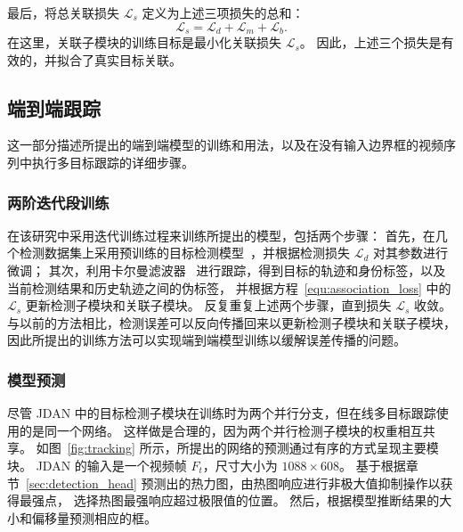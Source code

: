 最后，将总关联损失 $\mathcal L_s$ 定义为上述三项损失的总和：
\begin{equation} \label{equ:association_loss}
\mathcal L_{s} = \mathcal L_d + \mathcal L_m + \mathcal L_b.
\end{equation} 
在这里，关联子模块的训练目标是最小化关联损失 $\mathcal{L}_s$。
因此，上述三个损失是有效的，并拟合了真实目标关联。


\subsection{端到端跟踪}
这一部分描述所提出的端到端模型的训练和用法，以及在没有输入边界框的视频序列中执行多目标跟踪的详细步骤。

\subsubsection{两阶迭代段训练}
\label{sec:two_stage}
在该研究中采用迭代训练过程来训练所提出的模型，包括两个步骤：
首先，在几个检测数据集上采用预训练的目标检测模型~\cite{zhang2017citypersons,xiao2017joint,zheng2017person}，并根据检测损失 $\mathcal{L}_{d}$ 对其参数进行微调；
其次，利用卡尔曼滤波器~\cite{welch1995introduction} 进行跟踪，得到目标的轨迹和身份标签，以及当前检测结果和历史轨迹之间的伪标签，
并根据方程~\ref{equ:association_loss} 中的 $\mathcal{L}_{s}$ 更新检测子模块和关联子模块。
反复重复上述两个步骤，直到损失 $\mathcal{L}_{s}$ 收敛。
与以前的方法相比，检测误差可以反向传播回来以更新检测子模块和关联子模块，
因此所提出的训练方法可以实现端到端模型训练以缓解误差传播的问题。

%


\label{sec:dep}
\subsubsection{模型预测}
尽管 JDAN 中的目标检测子模块在训练时为两个并行分支，但在线多目标跟踪使用的是同一个网络。
这样做是合理的，因为两个并行检测子模块的权重相互共享。
如图~\ref{fig:tracking} 所示，所提出的网络的预测通过有序的方式呈现主要模块。
JDAN 的输入是一个视频帧 $F_t$，尺寸大小为 $1088 \times 608$。
基于根据章节~\ref{sec:detection_head} 预测出的热力图，由热图响应进行非极大值抑制操作以获得最强点，
选择热图最强响应超过极限值的位置。
然后，根据模型推断结果的大小和偏移量预测相应的框。

